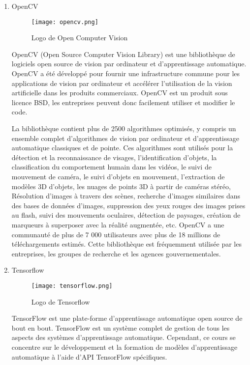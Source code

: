 \begin{enumerate}
        \bfseries
        \item OpenCV
        \begin{figure}[H]
            \centering
            \texttt{[image: opencv.png]}
            \caption{Logo de Open Computer Vision}\label{fig:opencv}
        \end{figure}
        \normalfont
        OpenCV (Open Source Computer Vision Library) est une bibliothèque de logiciels open source de vision par ordinateur et d'apprentissage automatique. OpenCV a été développé pour fournir une infrastructure commune pour les applications de vision par ordinateur et  accélérer l'utilisation de la vision artificielle dans les produits commerciaux. OpenCV est un produit sous licence BSD, les entreprises peuvent donc facilement utiliser et  modifier  le code.
        
        La bibliothèque contient plus de 2500 algorithmes optimisés, y compris un ensemble complet d'algorithmes de vision par ordinateur et d'apprentissage automatique classiques et  de pointe. Ces algorithmes sont utilisés pour la détection et la reconnaissance de visages, l'identification d'objets, la classification du comportement humain dans les vidéos, le suivi de mouvement de caméra, le suivi d'objets en mouvement, l'extraction de modèles 3D d'objets, les nuages de points 3D à partir de caméras stéréo, Résolution d'images à travers des scènes, recherche d'images similaires dans des bases de données d'images, suppression des yeux rouges des images prises au flash, suivi des mouvements oculaires, détection de paysages, création de marqueurs à superposer avec la réalité augmentée, etc. OpenCV a une communauté de plus de 7 000 utilisateurs avec plus de 18 millions de téléchargements estimés. Cette bibliothèque est fréquemment utilisée par les entreprises, les groupes de recherche et les agences gouvernementales.

        \bfseries
        \item Tensorflow
        \begin{figure}[H]
            \centering
            \texttt{[image: tensorflow.png]}
            \caption{Logo de Tensorflow}\label{fig:tensorflow}
        \end{figure}
        \normalfont
        TensorFlow est une plate-forme d'apprentissage automatique open source de bout en bout. TensorFlow est un système complet de gestion de tous les aspects des systèmes d'apprentissage automatique. Cependant, ce cours se concentre sur le développement et la formation de modèles d'apprentissage automatique à l'aide d'API TensorFlow spécifiques. 
        

\end{enumerate}
